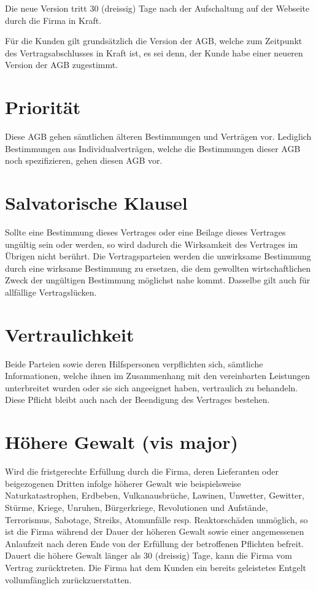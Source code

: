 \documentclass[twocolumn, 10pt]{article}
\begin{document}
Die neue Version tritt 30 (dreissig) Tage nach der Aufschaltung auf der Webseite durch die Firma in Kraft.

Für die Kunden gilt grundsätzlich die Version der AGB, welche zum Zeitpunkt des Vertragsabschlusses in Kraft ist, es sei denn, der Kunde habe einer neueren Version der AGB zugestimmt.

\section{Priorität}
Diese AGB gehen sämtlichen älteren Bestimmungen und Verträgen vor. Lediglich Bestimmungen aus Individualverträgen, welche die Bestimmungen dieser AGB noch spezifizieren, gehen diesen AGB vor.

\section{Salvatorische Klausel}
Sollte eine Bestimmung dieses Vertrages oder eine Beilage dieses Vertrages ungültig sein oder werden, so wird dadurch die Wirksamkeit des Vertrages im Übrigen nicht berührt. Die Vertragsparteien werden die unwirksame Bestimmung durch eine wirksame Bestimmung zu ersetzen, die dem gewollten wirtschaftlichen Zweck der ungültigen Bestimmung möglichst nahe kommt. Dasselbe gilt auch für allfällige Vertragslücken.

\section{Vertraulichkeit}
Beide Parteien sowie deren Hilfspersonen verpflichten sich, sämtliche Informationen, welche ihnen im Zusammenhang mit den vereinbarten Leistungen unterbreitet wurden oder sie sich angeeignet haben, vertraulich zu behandeln. Diese Pflicht bleibt auch nach der Beendigung des Vertrages bestehen.

\section{Höhere Gewalt (vis major)}
Wird die fristgerechte Erfüllung durch die Firma, deren Lieferanten oder beigezogenen Dritten infolge höherer Gewalt wie beispielsweise Naturkatastrophen, Erdbeben, Vulkanausbrüche, Lawinen, Unwetter, Gewitter, Stürme, Kriege, Unruhen, Bürgerkriege, Revolutionen und Aufstände, Terrorismus, Sabotage, Streiks, Atomunfälle resp. Reaktorschäden unmöglich, so ist die Firma während der Dauer der höheren Gewalt sowie einer angemessenen Anlaufzeit nach deren Ende von der Erfüllung der betroffenen Pflichten befreit. Dauert die höhere Gewalt länger als 30 (dreissig) Tage, kann die Firma vom Vertrag zurücktreten. Die Firma hat dem Kunden ein bereits geleistetes Entgelt vollumfänglich zurückzuerstatten.
\end{document}
